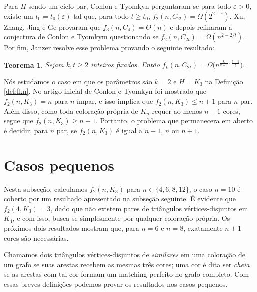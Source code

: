 \documentclass[12pt,a4paper]{book}
\let\eps=\varepsilon
\newtheorem{teorema}{Teorema}[chapter]
\begin{document}
Para $H$ sendo um ciclo par, Conlon e Tyomkyn \cite{conlontyomkyn} perguntaram se para todo $\eps >0$,
existe um $t_0 = t_0(\eps)$ tal que, para todo 
$t \geq t_0$, $f_2(n, C_{2t}) = \Omega(2^{2-\eps})$.
%
Xu, Zhang, Jing e Ge \cite{ge2020color} provaram que $f_3(n, C_4) = \Theta(n)$ e depois refinaram a conjectura de Conlon e Tyomkym questionando se
$f_2(n, C_{2t}) = \Omega(n^{2-2/t})$. 
Por fim, Janzer \cite{janzer2020rainbow} resolve esse problema provando o seguinte resultado:
 
    \begin{teorema}\label{teo:janzer-ciclos}\cite{janzer2020rainbow}
           Sejam $k,t \geq 2$ inteiros fixados. Então $f_k(n,C_{2t}) = \Omega\big(n^{\frac{k}{k-1} \cdot\frac{t-1}{t}}\big)$.
    \end{teorema}

Nós estudamos o caso em que os parâmetros são $k = 2$ e $H = K_3$ na Definição \ref{def:fkn}. 
No artigo inicial de Conlon e Tyomkyn foi mostrado que $f_2(n,K_3) = n$ para
$n$ ímpar, e isso implica que $f_2(n,K_3) \leq n + 1$ para $n$ par. 
Além disso, como toda coloração própria de $K_n$ requer ao menos $n-1$ cores, segue que $f_2(n,K_3) \geq n- 1$.
Portanto, o problema que permanecera em aberto é decidir, para $n$ par, se $f_2(n,K_3)$ é igual a $n-1$, $n$ ou $n + 1$.

\section{Casos pequenos}

Nesta subseção, calculamos $f_2(n,K_3)$ para $n \in \{4,6,8,12\}$, o caso $n=10$ é coberto por um resultado apresentado na subseção seguinte. 
É evidente que $f_2(4,K_3) = 3$, dado que não existem pares de triângulos vértices-disjuntos em $K_4$, e com isso, busca-se simplesmente por qualquer coloração própria. 
Os próximos dois resultados mostram que, para $n = 6$ e $n = 8$, exatamente $n + 1$ cores são necessárias.

Chamamos dois triângulos vértices-disjuntos de \textit{similares} em uma coloração de um grafo se suas arestas recebem as mesmas três cores;  uma cor é dita ser \textit{cheia} se as arestas com tal cor formam um matching perfeito no grafo completo. 
Com essas breves definições podemos provar os resultados nos casos pequenos.
\end{document}
